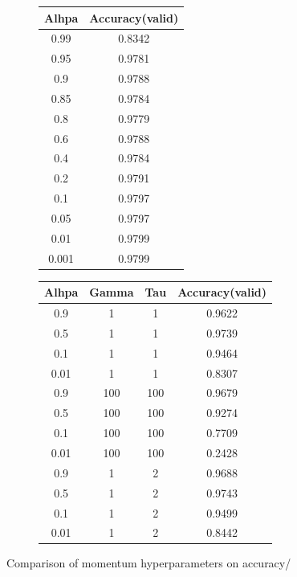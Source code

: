 \documentclass[12pt]{article}
\begin{document}
\begin{figure}[h]
\centering
\begin{subfigure}{.5\textwidth}
\centering
\begin{tabular}[h]{| c | c |}
\hline
Alhpa &  Accuracy(valid) \\
\hline
0.99 & 0.8342 \\
\hline
0.95 & 0.9781 \\
\hline
0.9 & 0.9788 \\
\hline
0.85 & 0.9784 \\
\hline
0.8 & 0.9779 \\
\hline
0.6 & 0.9788 \\
\hline
0.4 & 0.9784 \\
\hline
0.2 & 0.9791 \\
\hline
0.1 & 0.9797 \\
\hline
0.05 & 0.9797 \\
\hline
0.01 & 0.9799 \\
\hline
0.001 & 0.9799 \\
\hline
\end{tabular}
\end{subfigure}%
\begin{subfigure}{.5\textwidth}

\centering
\begin{tabular}[h]{| c | c | c | c |}
\hline
Alhpa & Gamma & Tau &  Accuracy(valid) \\
\hline
0.9 & 1 & 1 & 0.9622 \\
\hline
0.5 & 1 & 1 & 0.9739 \\
\hline
0.1 & 1 & 1 & 0.9464 \\
\hline
0.01 & 1 & 1 & 0.8307 \\
\hline
0.9 & 100 & 100 & 0.9679 \\
\hline
0.5 & 100 & 100 & 0.9274 \\
\hline
0.1 & 100 & 100 & 0.7709 \\
\hline
0.01 & 100 & 100 & 0.2428 \\
\hline
0.9 & 1 & 2 & 0.9688 \\
\hline
0.5 & 1 & 2 & 0.9743 \\
\hline
0.1 & 1 & 2 & 0.9499 \\
\hline
0.01 & 1 & 2 & 0.8442 \\
\hline
\end{tabular}
\end{subfigure}%

  \caption{Comparison of momentum hyperparameters on accuracy/}
  \label{fig:task2_table}
\end{figure}
\end{document}
